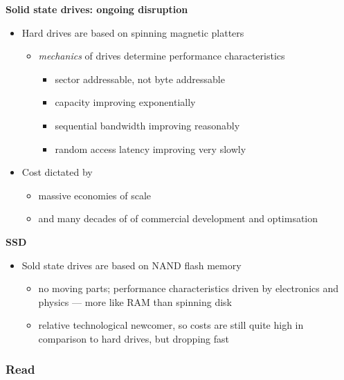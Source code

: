 \documentclass[11pt,a4paper]{article}
\begin{document}
\textbf{Solid state drives: ongoing disruption}
\begin{itemize}
    \item Hard drives are based on spinning magnetic platters
        \begin{itemize}
            \item \emph{mechanics} of drives determine performance characteristics
                \begin{itemize}
                    \item sector addressable, not byte addressable
                    \item capacity improving exponentially
                    \item sequential bandwidth improving reasonably
                    \item random access latency improving very slowly
                \end{itemize}
        \end{itemize}
    \item Cost dictated by
        \begin{itemize}
            \item  massive economies of scale
            \item and many decades of of commercial development and optimsation
        \end{itemize}
\end{itemize}

\textbf{SSD}
\begin{itemize}
    \item Sold state drives are based on NAND flash memory
        \begin{itemize}
            \item no moving parts; performance characteristics driven by electronics and
                physics --- more like RAM than spinning disk
            \item relative technological newcomer, so costs are still quite high in comparison
                to hard drives, but dropping fast
        \end{itemize}
\end{itemize}

\subsubsection{Read}
\end{document}
